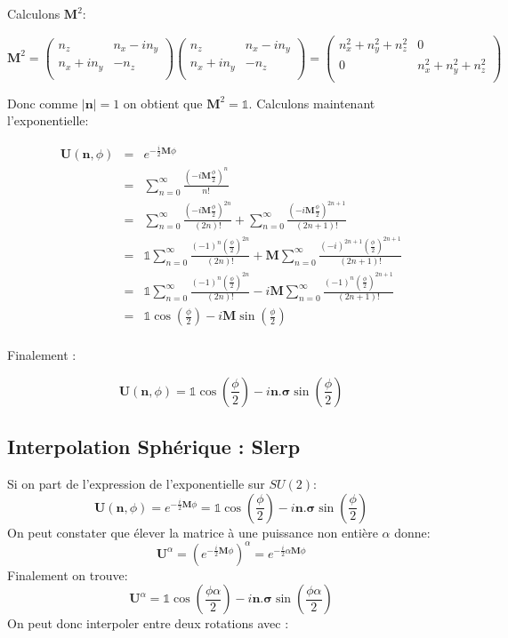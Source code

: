\documentclass[12pt,a4paper]{article}
\newcommand{\unit}
{
\bm{\mathds{1}}
}
\begin{document}
Calculons $\bm{M}^2$:

\[
	\bm{M}^2=\begin{pmatrix}
	n_z&n_x-i n_y\\
	n_x+i n_y&-n_z\\
	\end{pmatrix}
	\begin{pmatrix}
	n_z&n_x-i n_y\\
	n_x+i n_y&-n_z\\
	\end{pmatrix}
	=
	\begin{pmatrix}
	n_x^2+ n_y^2+n_z^2&0\\
	0&n_x^2+ n_y^2+n_z^2\\
	\end{pmatrix}
\]

Donc comme $|\bm{n}|=1$ on obtient que $\boxed{\bm{M}^2=\unit}$. Calculons maintenant l'exponentielle:

\begin{eqnarray*}
\bm{U}(\bm{n},\phi) &=& e^{-\frac{i}{2} \bm{M} \phi}\\
&=& \sum_{n=0}^{\infty} \frac{(-i \bm{M} \frac{\phi}{2})^n}{n!} \\
&=& \sum_{n=0}^{\infty} \frac{(-i \bm{M} \frac{\phi}{2})^{2n}}{(2n)!} +\sum_{n=0}^{\infty} \frac{(-i \bm{M} \frac{\phi}{2})^{2n+1}}{(2n+1)!} \\
&=& \unit \sum_{n=0}^{\infty} \frac{(-1)^n (\frac{\phi}{2})^{2n}}{(2n)!} +\bm{M}\sum_{n=0}^{\infty} \frac{(-i)^{2n+1} (\frac{\phi}{2})^{2n+1}}{(2n+1)!} \\
&=& \unit \sum_{n=0}^{\infty} \frac{(-1)^n (\frac{\phi}{2})^{2n}}{(2n)!}-i \bm{M}\sum_{n=0}^{\infty} \frac{(-1)^{n} (\frac{\phi}{2})^{2n+1}}{(2n+1)!} \\
&=& \unit \cos\left(\frac{\phi}{2}\right)-i \bm{M} \sin\left(\frac{\phi}{2}\right)\\
\end{eqnarray*}

Finalement :

\[
\boxed{\bm{U}(\bm{n},\phi)= \unit \cos\left(\frac{\phi}{2}\right)-i \bm{n}.\bm{\sigma} \sin\left(\frac{\phi}{2}\right)}
\]

\newpage
\subsection{Interpolation Sphérique : Slerp}

Si on part de l'expression de l'exponentielle sur $SU(2)$: 
\[
\bm{U}(\bm{n},\phi)=e^{-\frac{i}{2} \bm{M} \phi}= \unit \cos\left(\frac{\phi}{2}\right)-i \bm{n}.\bm{\sigma} \sin\left(\frac{\phi}{2}\right)
\]
On peut constater que élever la matrice à une puissance non entière $\alpha$ donne:
\[
\bm{U}^\alpha=\left(e^{-\frac{i}{2} \bm{M} \phi}\right)^\alpha=e^{-\frac{i}{2}\alpha \bm{M} \phi}
\]
Finalement on trouve:
\[
\boxed{\bm{U}^\alpha=\unit \cos\left(\frac{\phi\alpha}{2}\right)-i \bm{n}.\bm{\sigma} \sin\left(\frac{\phi\alpha}{2}\right)}
\]
On peut donc interpoler entre deux rotations avec :
\end{document}
